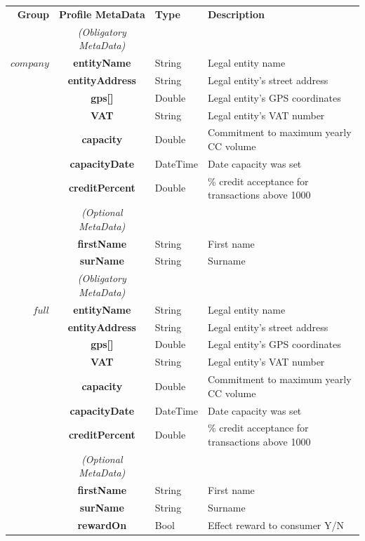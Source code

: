 \begin{table}[H]
\begin{centering}
\small
{
\begin{tabular}{ r | c | l | l }
\textbf{Group}	& {\bf Profile MetaData} & {\bf Type} & {\bf Description} \\
\Xhline{1.5pt}
			& \emph{(Obligatory MetaData)} & & \\
\cline{2-2}
$company$	& {\bf entityName}			&String	& Legal entity name \\
			& {\bf entityAddress}			&String	& Legal entity's street address \\
			& {\bf gps[]}				&Double	& Legal entity's GPS coordinates \\
			& {\bf VAT}				&String	& Legal entity's VAT number \\
			& {\bf capacity}				&Double	& Commitment to maximum yearly CC volume \\
			& {\bf capacityDate}			&DateTime & Date capacity was set \\
			& {\bf creditPercent}			&Double	& \% credit acceptance for transactions above 1000 \\
\cline{2-2}
			 & \emph{(Optional MetaData)}& & \\
\cline{2-2}
			& {\bf firstName	}			&String & First name \\
			& {\bf surName}			&String & Surname \\
\Xhline{1.5pt}
			& \emph{(Obligatory MetaData)} & & \\
\cline{2-2}
$full$		& {\bf entityName}			&String	& Legal entity name \\
			& {\bf entityAddress}			&String	& Legal entity's street address \\
			& {\bf gps[]}				&Double	& Legal entity's GPS coordinates \\
			& {\bf VAT}				&String	& Legal entity's VAT number \\
			& {\bf capacity}				&Double	& Commitment to maximum yearly CC volume \\
			& {\bf capacityDate}			&DateTime & Date capacity was set \\
			& {\bf creditPercent}			&Double	& \% credit acceptance for transactions above 1000 \\
\cline{2-2}
			 & \emph{(Optional MetaData)}& & \\
\cline{2-2}
			& {\bf firstName}			&String	& First name \\
			& {\bf surName}			&String	& Surname \\
			& {\bf rewardOn}			&Bool	& Effect reward to consumer Y/N \\

\end{tabular}}
\end{centering}
\end{table}
